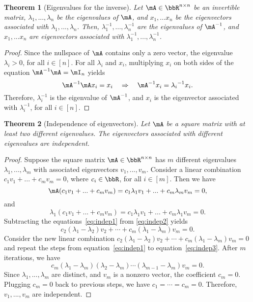 \documentclass[11pt]{article}
\theoremstyle{plain}
\newtheorem{thm}{Theorem}[section]
\theoremstyle{definition}
\begin{document}
\begin{thm}[Eigenvalues for the inverse]
Let $\mA \in \bbR^{n \times n}$ be an invertible matrix, $\lambda_1,...,\lambda_n$ be the eigenvalues of $\mA$, and $x_1,...x_n$ be the eigenvectors associated with $\lambda_1,...,\lambda_n$. Then,  $\lambda_1^{-1},...,\lambda_n^{-1}$  are the eigenvalues of $\mA^{-1}$, and $x_1,...x_n$ are eigenvectors associated with  $\lambda_1^{-1},...,\lambda_n^{-1}$.
\end{thm}

\begin{proof}
	Since the nullspace of $\mA$ contains only a zero vector, the eigenvalue $\lambda_i >0$, for all $  i \in [n]$. For all $\lambda_i$ and $x_i$, multiplying $x_i$ on both sides of the equation $\mA^{-1} \mA = \mI_n$ yields
	\[ \mA^{-1} \mA x_i = x_i \quad \Rightarrow\quad  \mA^{-1} x_i = {\lambda_i}^{-1} x_i.  \]
	Therefore, $\lambda_i^{-1}$ is the eigenvalue of $\mA^{-1}$, and $x_i$ is the eigenvector associated with $\lambda^{-1}_i$, for all $i \in [n]$.
\end{proof}

\begin{thm}[Independence of eigenvectors]\label{thm:indepeigen} 
Let $\mA$ be a square matrix with at least two different eigenvalues. The eigenvectors associated with different eigenvalues are independent.
\end{thm}

\begin{proof}
	Suppose the square matrix $\mA \in \bbR^{n \times n}$ has $m$ different eigenvalues $\lambda_1,...,\lambda_m$ with associated eigenvectors  $v_1,...,v_m$. Consider a linear combination $c_1 v_1 + ... + c_m v_m = 0$, where $c_i \in \bbR$, for all $i \in [m]$.	
	Then we have
	\begin{equation}\label{eq:indep1}
		\mA(c_1 v_1 + ... + c_m v_m ) = c_1 \lambda_1 v_1 + ... + c_m \lambda_m v_m = 0,
		\end{equation}
		and
		\begin{equation}\label{eq:indep2}
		\lambda_1 (c_1 v_1 + ... + c_m v_m ) = c_1 \lambda_1 v_1 + ... + c_m \lambda_1 v_m = 0. 
	\end{equation}
	Subtracting the equations~\eqref{eq:indep1} from \eqref{eq:indep2} yields
	\begin{equation}\label{eq:indep3}
		 c_2 (\lambda_1 - \lambda_2) v_2 + \cdots + c_m (\lambda_1 - \lambda_m) v_m  = 0.
	\end{equation}
	Consider the new linear combination $ c_2 (\lambda_1 - \lambda_2) v_2 + \cdots + c_m (\lambda_1 - \lambda_m) v_m = 0$ and repeat the steps from equation~\eqref{eq:indep1} to equation~\eqref{eq:indep3}. After $m$ iterations, we have 
	\[ c_m(\lambda_1 - \lambda_m)(\lambda_2 - \lambda_m)\cdots (\lambda_{m-1} - \lambda_m) v_m = 0.    \]
	 Since $\lambda_1 ,..., \lambda_m$ are distinct, and $v_m$ is a nonzero vector, the coefficient $c_m = 0$.  Plugging $c_m = 0$ back to previous steps, we have $c_1 = \cdots = c_m = 0$. Therefore, $v_1,...,v_m$ are independent.
\end{proof}
\end{document}
